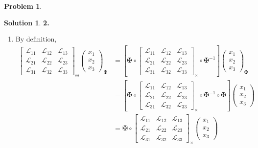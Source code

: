 \documentclass{article}
\theoremstyle{definition}
\newtheorem*{prob*}{Problem}
\newtheorem*{sln*}{Solution}
\newcommand{\lag}{\mathcal{L}}
\begin{document}
\begin{prob*}
	\begin{sln*}\textbf{2.}
		\begin{enumerate}
			\item  By definition,
			\begin{align*}
			\begin{bmatrix}
			\lag_{11} & \lag_{12} & \lag_{13}\\
			\lag_{21} & \lag_{22} & \lag_{23}\\
			\lag_{31} & \lag_{32} & \lag_{33}
			\end{bmatrix}_{\oplus}
			\begin{pmatrix}
			x_1\\x_2\\x_3
			\end{pmatrix}_{\maltese} 
			&=
			\left[\maltese
			\circ
			\begin{bmatrix}
			\lag_{11} & \lag_{12} & \lag_{13}\\
			\lag_{21} & \lag_{22} & \lag_{23}\\
			\lag_{31} & \lag_{32} & \lag_{33}
			\end{bmatrix}_\times 
			\circ 
			\maltese^{-1}\right]\begin{pmatrix}
			x_1\\x_2\\x_3
			\end{pmatrix}_{\maltese} \\
			&= \left[\maltese
			\circ
			\begin{bmatrix}
			\lag_{11} & \lag_{12} & \lag_{13}\\
			\lag_{21} & \lag_{22} & \lag_{23}\\
			\lag_{31} & \lag_{32} & \lag_{33}
			\end{bmatrix}_\times 
			\circ 
			\maltese^{-1}\circ\maltese\right]\begin{pmatrix}
			x_1\\x_2\\x_3
			\end{pmatrix}\\
			&= \maltese
			\circ
			\begin{bmatrix}
			\lag_{11} & \lag_{12} & \lag_{13}\\
			\lag_{21} & \lag_{22} & \lag_{23}\\
			\lag_{31} & \lag_{32} & \lag_{33}
			\end{bmatrix}_\times \begin{pmatrix}
			x_1\\x_2\\x_3
			\end{pmatrix}\\

\end{align*}
\end{enumerate}
\end{sln*}
\end{prob*}
\end{document}
